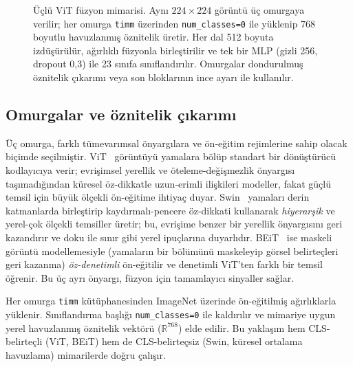 \begin{figure}[H]
  \caption{Üçlü ViT füzyon mimarisi. Aynı $224{\times}224$ görüntü üç omurgaya
  verilir; her omurga \texttt{timm} üzerinden \texttt{num\_classes=0} ile yüklenip
  768 boyutlu havuzlanmış öznitelik üretir. Her dal 512 boyuta izdüşürülür,
  ağırlıklı füzyonla birleştirilir ve tek bir MLP (gizli 256, dropout 0,3) ile 23
  sınıfa sınıflandırılır. Omurgalar dondurulmuş öznitelik çıkarımı veya son
  bloklarının ince ayarı ile kullanılır.}
  \label{fig:arch}
\end{figure}

\subsection{Omurgalar ve öznitelik çıkarımı}
Üç omurga, farklı tümevarımsal önyargılara ve ön-eğitim rejimlerine sahip olacak
biçimde seçilmiştir. ViT~\cite{dosovitskiy2021vit} görüntüyü yamalara bölüp standart
bir dönüştürücü kodlayıcıya verir; evrişimsel yerellik ve öteleme-değişmezlik
önyargısı taşımadığından küresel öz-dikkatle uzun-erimli ilişkileri modeller, fakat
güçlü temsil için büyük ölçekli ön-eğitime ihtiyaç duyar.
Swin~\cite{liu2021swin} yamaları derin katmanlarda birleştirip kaydırmalı-pencere
öz-dikkati kullanarak \emph{hiyerarşik} ve yerel-çok ölçekli temsiller üretir; bu,
evrişime benzer bir yerellik önyargısını geri kazandırır ve doku ile sınır gibi
yerel ipuçlarına duyarlıdır. BEiT~\cite{bao2022beit} ise maskeli görüntü
modellemesiyle (yamaların bir bölümünü maskeleyip görsel belirteçleri geri kazanma)
\emph{öz-denetimli} ön-eğitilir ve denetimli ViT'ten farklı bir temsil öğrenir. Bu
üç ayrı önyargı, füzyon için tamamlayıcı sinyaller sağlar.

Her omurga \texttt{timm} kütüphanesinden ImageNet üzerinde ön-eğitilmiş ağırlıklarla
yüklenir. Sınıflandırma başlığı \texttt{num\_classes=0} ile kaldırılır ve mimariye
uygun yerel havuzlanmış öznitelik vektörü ($\mathbb{R}^{768}$) elde edilir. Bu
yaklaşım hem CLS-belirteçli (ViT, BEiT) hem de CLS-belirteçsiz (Swin, küresel
ortalama havuzlama) mimarilerde doğru çalışır.

